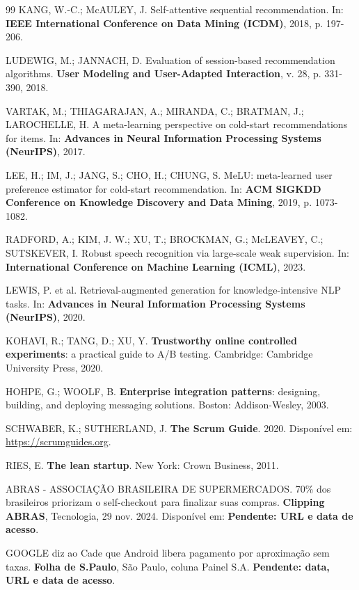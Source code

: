 \documentclass[12pt,a4paper]{article}
\newcommand{\pendentecurto}[1]{\colorbox{pendbg}{\color{pendfg}\footnotesize\bfseries Pendente: #1}}
\begin{document}
{\begin{thebibliography}{99}
KANG, W.-C.; McAULEY, J. Self-attentive sequential recommendation. In: \textbf{IEEE International Conference on Data Mining (ICDM)}, 2018, p. 197-206.

LUDEWIG, M.; JANNACH, D. Evaluation of session-based recommendation algorithms. \textbf{User Modeling and User-Adapted Interaction}, v. 28, p. 331-390, 2018.

VARTAK, M.; THIAGARAJAN, A.; MIRANDA, C.; BRATMAN, J.; LAROCHELLE, H. A meta-learning perspective on cold-start recommendations for items. In: \textbf{Advances in Neural Information Processing Systems (NeurIPS)}, 2017.

LEE, H.; IM, J.; JANG, S.; CHO, H.; CHUNG, S. MeLU: meta-learned user preference estimator for cold-start recommendation. In: \textbf{ACM SIGKDD Conference on Knowledge Discovery and Data Mining}, 2019, p. 1073-1082.

RADFORD, A.; KIM, J. W.; XU, T.; BROCKMAN, G.; McLEAVEY, C.; SUTSKEVER, I. Robust speech recognition via large-scale weak supervision. In: \textbf{International Conference on Machine Learning (ICML)}, 2023.

LEWIS, P. et al. Retrieval-augmented generation for knowledge-intensive NLP tasks. In: \textbf{Advances in Neural Information Processing Systems (NeurIPS)}, 2020.

KOHAVI, R.; TANG, D.; XU, Y. \textbf{Trustworthy online controlled experiments}: a practical guide to A/B testing. Cambridge: Cambridge University Press, 2020.

HOHPE, G.; WOOLF, B. \textbf{Enterprise integration patterns}: designing, building, and deploying messaging solutions. Boston: Addison-Wesley, 2003.

SCHWABER, K.; SUTHERLAND, J. \textbf{The Scrum Guide}. 2020. Disponível em: \url{https://scrumguides.org}.

RIES, E. \textbf{The lean startup}. New York: Crown Business, 2011.

ABRAS - ASSOCIAÇÃO BRASILEIRA DE SUPERMERCADOS. 70\% dos brasileiros priorizam o self-checkout para finalizar suas compras. \textbf{Clipping ABRAS}, Tecnologia, 29 nov. 2024. Disponível em: \pendentecurto{URL e data de acesso}.

GOOGLE diz ao Cade que Android libera pagamento por aproximação sem taxas. \textbf{Folha de S.Paulo}, São Paulo, coluna Painel S.A. \pendentecurto{data, URL e data de acesso}.

\end{thebibliography}}
\end{document}
